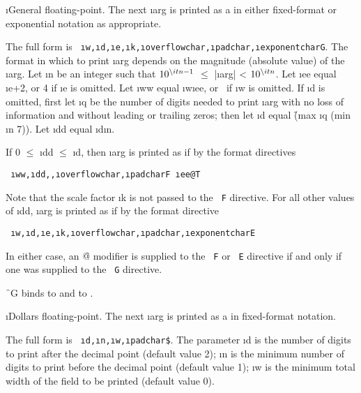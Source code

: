 
\i{General floating-point}.  The next \i{arg} is printed as a  
in either fixed-format or exponential notation as appropriate.

The full form is {\tt ~\i{w},\i{d},\i{e},\i{k},\i{overflowchar},\i{padchar},\i{exponentchar}G}.
The format in which to print \i{arg} depends on the magnitude (absolute
value) of the \i{arg}.  Let \i{n} be an integer such that
$10^{\i{n}-1}$ $\le$ |\i{arg}| < $10^\i{n}$.
Let \i{ee} equal \i{e}+2, or 4 if \i{e} is omitted.
Let \i{ww} equal \i{w}\minussign \i{ee},
or \nil\ if \i{w} is omitted.  If \i{d} is omitted, first let \i{q}
be the number of digits needed to print \i{arg} with no loss
of information and without leading or trailing zeros;
then let \i{d} equal \f{(max \i{q} (min \i{n} 7))}.
Let \i{dd} equal \i{d}\minussign \i{n}.

If 0 $\le$ \i{dd} $\le$ \i{d}, then \i{arg} is printed
as if by the format directives
                                                                         
{\tt ~\i{ww},\i{dd},,\i{overflowchar},\i{padchar}F~\i{ee}@T}

Note that the scale factor \i{k} is not passed to the {\tt ~F}
directive.  For all other values of \i{dd}, \i{arg} is printed as if
by the format directive

{\tt ~\i{w},\i{d},\i{e},\i{k},\i{overflowchar},\i{padchar},\i{exponentchar}E}

In either case, an \f{@}
modifier is supplied to the {\tt ~F}
or {\tt ~E} directive if and only if one was supplied to the
{\tt ~G} directive.

\f{~G} binds
      to 
 and  to .

\itemitem{\tt ~\$}

\i{Dollars floating-point}.  The next \i{arg} is printed as a 
in fixed-format notation.  

The full form is {\tt ~\i{d},\i{n},\i{w},\i{padchar}\$}.
The parameter \i{d} is the number
of digits to print after the decimal point (default value 2);
\i{n} is the minimum number of digits to print before the decimal
point (default value 1);
\i{w} is the minimum total width of the field to be printed (default
value 0).

